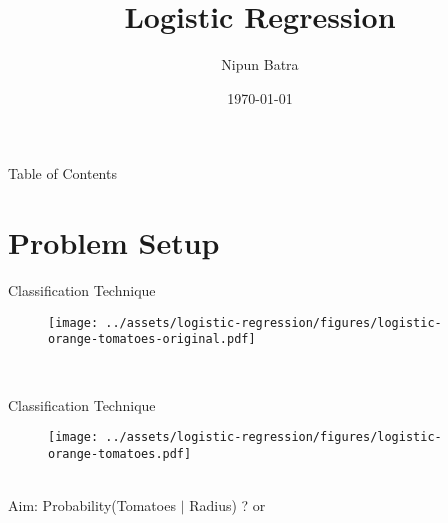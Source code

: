 \documentclass{beamer}
\title{Logistic Regression}
\date{\today}
\author{Nipun Batra}
\institute{IIT Gandhinagar}
\begin{document}
\maketitle

\begin{frame}{Table of Contents}
\tableofcontents
\end{frame}

\section{Problem Setup}
	
	\begin{frame}{Classification Technique}
	\begin{minipage}{0.3\textwidth}
		
		\begin{figure}
			
			\texttt{[image: ../assets/logistic-regression/figures/logistic-orange-tomatoes-original.pdf]}
		\end{figure}
	\end{minipage} \\

	
\end{frame}
	
	\begin{frame}{Classification Technique}
	\begin{minipage}{0.3\textwidth}
		
		\begin{figure}
			
			\texttt{[image: ../assets/logistic-regression/figures/logistic-orange-tomatoes.pdf]}
		\end{figure}
	\end{minipage} \\
	\pause Aim: Probability(Tomatoes $|$ Radius) ? or
	\pause {}
	
\end{frame}
\end{document}
